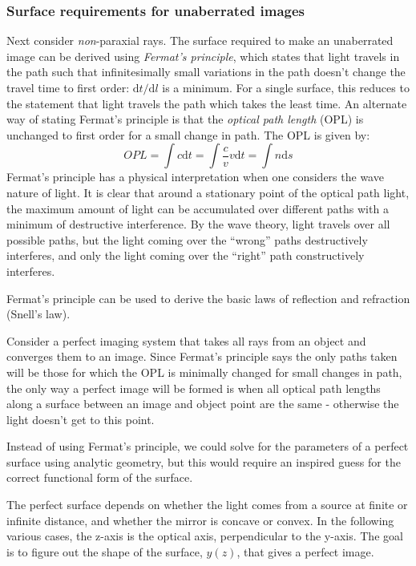 \documentclass[12pt]{article}
\begin{document}
\subsubsection{Surface requirements for unaberrated images}
Next consider \emph{non}-paraxial rays. The surface required to make an
unaberrated image can be derived using \textit{Fermat's principle}, which
states that light travels in the path such that infinitesimally small
variations in the path doesn't change the travel time to first order:
$\mathrm{d}t/\mathrm{d}l$ is a minimum. For a single surface, this reduces to
the statement that light travels the path which takes the least time. An
alternate way of stating Fermat's principle is that the \emph{optical path
length} (OPL) is unchanged to first order for a small change in path. The OPL
is given by:
\[
    OPL
    = \int{c\mathrm{d}t}
    = \int{\frac{c}{v}v\mathrm{d}t}
    = \int{n\mathrm{d}s}
    \]
Fermat's principle has a physical interpretation when one considers the
wave nature of light. It is clear that around a stationary point of the
optical path light, the maximum amount of light can be accumulated over
different paths with a minimum of destructive interference. By the wave
theory, light travels over all possible paths, but the light coming over
the ``wrong'' paths destructively interferes, and only the light coming over
the ``right'' path constructively interferes.

Fermat's principle can be used to derive the basic laws of reflection
and refraction (Snell's law).

Consider a perfect imaging system that takes all rays from an object
and converges them to an image. Since Fermat's principle says
the only paths taken will be those for which the OPL is minimally changed
for small changes in path, the only way a perfect image will be formed is
when all optical path lengths along a surface between an image and object
point are the same - otherwise the light doesn't get to this point.

Instead of using Fermat's principle, we could solve for the parameters
of a perfect surface using analytic geometry, but this would require an
inspired guess for the correct functional form of the surface.

The perfect surface depends on whether the light comes from a source at finite
or infinite distance, and whether the mirror is concave or convex. In the
following various cases, the z-axis is the optical axis, perpendicular to the
y-axis. The goal is to figure out the shape of the surface, $y(z)$, that gives
a perfect image.
\end{document}
